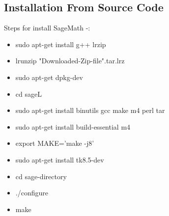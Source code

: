 \subsection{Installation From Source Code}
Steps for install SageMath -:
\begin{itemize}
\item	sudo apt-get install g++ lrzip
\item	lrunzip  "Downloaded-Zip-file".tar.lrz
\item	sudo apt-get dpkg-dev
\item	cd sageL
\item	sudo apt-get install binutils gcc make m4 perl tar
\item	sudo apt-get install build-essential m4
\item	export MAKE='make -j8'
\item	sudo apt-get install tk8.5-dev
\item	cd sage-directory
\item	./configure
\item	make
\end{itemize}
